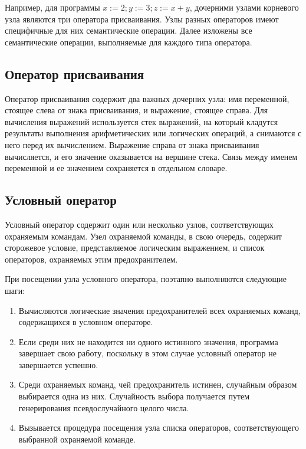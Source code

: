 Например, для программы $x := 2; y := 3; z := x + y$, 
дочерними узлами корневого узла являются три оператора присваивания.
Узлы разных операторов имеют специфичные для них семантические операции. Далее изложены все семантические операции,
выполняемые для каждого типа оператора.

\subsection{Оператор присваивания}
Оператор присваивания содержит два важных дочерних узла: имя переменной, стоящее слева от знака присваивания,
и выражение, стоящее справа. Для вычисления выражений используется стек выражений, на который кладутся результаты
выполнения арифметических или логических операций, а снимаются с него перед их вычислением.
Выражение справа от знака присваивания вычисляется, и его значение оказывается на вершине стека.
Связь между именем переменной и ее значением сохраняется в отдельном словаре.

\subsection{Условный оператор}
Условный оператор содержит один или несколько узлов, соответствующих охраняемым командам.
Узел охраняемой команды, в свою очередь, содержит сторожевое условие, представляемое логическим выражением, и список операторов,
охраняемых этим предохранителем.

При посещении узла условного оператора, поэтапно выполняются следующие шаги:
\begin{enumerate}
    \item Вычисляются логические значения предохранителей всех охраняемых команд, содержащихся в условном операторе.
    \item Если среди них не находится ни одного истинного значения, программа завершает свою работу,
    поскольку в этом случае условный оператор не завершается успешно.
    \item Среди охраняемых команд, чей предохранитель истинен, случайным образом выбирается одна из них. Случайность
    выбора получается путем генерирования псевдослучайного целого числа. 
    \item Вызывается процедура посещения узла списка операторов, соответствующего выбранной охраняемой команде.
\end{enumerate}

